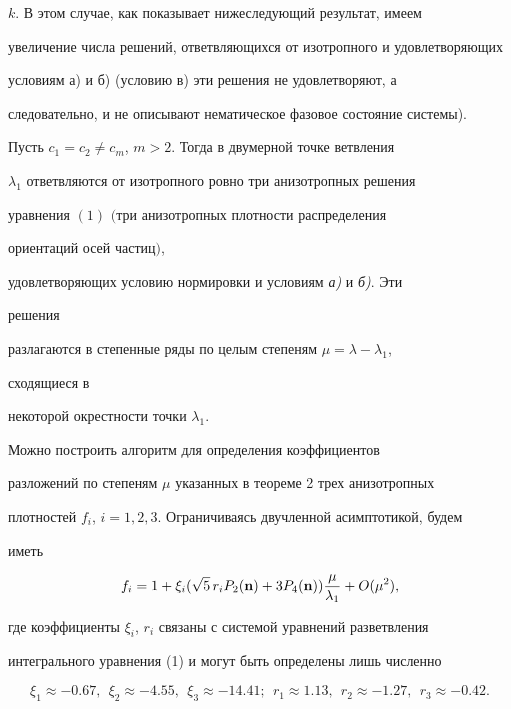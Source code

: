 $k$. В этом случае, как показывает нижеследующий результат, имеем 


увеличение числа решений, ответвляющихся от изотропного и удовлетворяющих 


условиям а) и б) (условию в) эти решения не удовлетворяют, а 


следовательно, и не описывают нематическое фазовое состояние системы).





\begin{thm}


Пусть $c_1=c_2\ne c_m$, $m>2$. Тогда в двумерной точке ветвления


$\lambda_1$ ответвляются от изотропного ровно три анизотропных решения 


уравнения $(1)$ $($три анизотропных плотности распределения


ориентаций осей частиц$)$,


удовлетворяющих условию нормировки и условиям {\em а)} и {\em б)}. Эти 


решения 


разлагаются в степенные ряды по целым степеням $\mu=\lambda-\lambda_1$, 


сходящиеся в


некоторой окрестности точки $\lambda_1$.


\end{thm}





\begin{note}


Можно построить алгоритм для определения коэффициентов 


разложений по степеням $\mu$ указанных в теореме 2 трех анизотропных


плотностей $f_i$, $i=1,2,3$. Ограничиваясь двучленной асимптотикой, будем


иметь


$$


f_i=1+\xi_i(\sqrt{5}\,r_i P_2(\bold n)+3P_4(\bold n))


\frac{\mu}{\lambda_1}+O(\mu^2),


$$


где коэффициенты $\xi_i$, $r_i$ связаны с системой уравнений разветвления 


интегрального уравнения (1) и могут быть определены лишь численно


$$


\xi_1\approx-0.67,\ \ \xi_2\approx-4.55,


\ \ \xi_3\approx-14.41;\ \ r_1\approx1.13,


\ \ r_2\approx-1.27,\ \ r_3\approx-0.42.


$$


\end{note}





